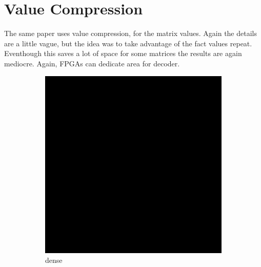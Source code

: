 \section{Value Compression}
\par The same paper \cite{prelim:kourtis} uses value compression, for the matrix values. Again the details are a little vague, but the idea was to take advantage of the fact values repeat. Eventhough this saves a lot of space for some matrices the results are again mediocre. Again, FPGAs can dedicate area for decoder.
\begin{figure}
\begin{multicols}{3}
\begin{subfigure}{\linewidth}
\includegraphics[width=\linewidth]{images/dense}
\caption{dense}
\end{subfigure}~%
\begin{subfigure}{\linewidth}

\end{subfigure}
\end{multicols}
\end{figure}
